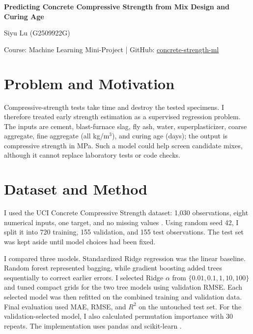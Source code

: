 \documentclass[10pt,a4paper]{article}
\begin{document}
\begin{center}
{\Large\bfseries Predicting Concrete Compressive Strength from Mix Design and Curing Age\par}
\vspace{4pt}
{\normalsize Siyu Lu (G2509922G)\par}
\vspace{2pt}
{\small Course: Machine Learning Mini-Project \quad | \quad GitHub: \href{https://github.com/lucylululu721/concrete-strength-ml}{concrete-strength-ml}\par}
\end{center}
\vspace{-7pt}

\section{Problem and Motivation}
Compressive-strength tests take time and destroy the tested specimens. I therefore treated early strength estimation as a supervised regression problem. The inputs are cement, blast-furnace slag, fly ash, water, superplasticizer, coarse aggregate, fine aggregate (all kg/m$^3$), and curing age (days); the output is compressive strength in MPa. Such a model could help screen candidate mixes, although it cannot replace laboratory tests or code checks.

\section{Dataset and Method}
I used the UCI Concrete Compressive Strength dataset: 1,030 observations, eight numerical inputs, one target, and no missing values \cite{uci,yeh}. Using random seed 42, I split it into 720 training, 155 validation, and 155 test observations. The test set was kept aside until model choices had been fixed.

I compared three models. Standardized Ridge regression was the linear baseline. Random forest represented bagging, while gradient boosting added trees sequentially to correct earlier errors. I selected Ridge $\alpha$ from $\{0.01,0.1,1,10,100\}$ and tuned compact grids for the two tree models using validation RMSE. Each selected model was then refitted on the combined training and validation data. Final evaluation used MAE, RMSE, and $R^2$ on the untouched test set. For the validation-selected model, I also calculated permutation importance with 30 repeats. The implementation uses pandas and scikit-learn \cite{sklearn}.
\end{document}
